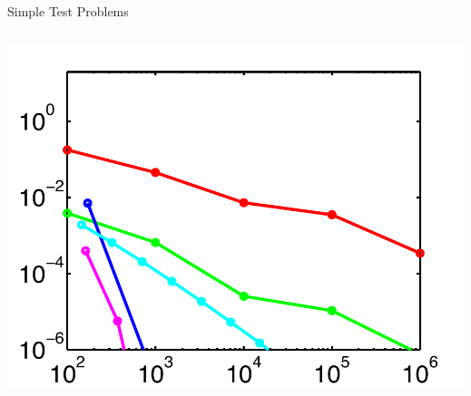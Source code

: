 \documentclass[final]{beamer}
\begin{document}
\begin{frame}{}
{\begin{columns}[t]
\begin{column}{.30\linewidth}
\begin{block}{\centering Simple Test Problems}
\vspace{0.5em}
\begin{columns}[T]

\begin{column}{12cm}{}
\centering\includegraphics[height=10cm, width = 14cm]{figures/gaussian2errors}\\


\end{column}
\end{columns}
\end{block}
\end{column}
\end{columns}}
\end{frame}
\end{document}
